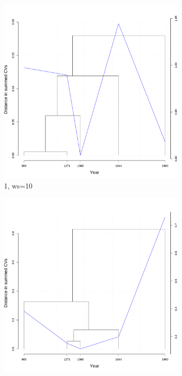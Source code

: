 \begin{figure}[H]
  \medskip
  \begin{subfigure}{0.3\textwidth}
    \includegraphics[width=\linewidth]{figures_new/measures/VNC_measure_dist_w10_first_embed.pdf}
    \caption*{1\sts  , ws=10}
  \end{subfigure}
  \quad
  \begin{subfigure}{0.3\textwidth}
    \includegraphics[width=\linewidth]{figures_new/measures/VNC_measure_dist_w10_second_embed_global.pdf}

\end{subfigure}
\end{figure}

